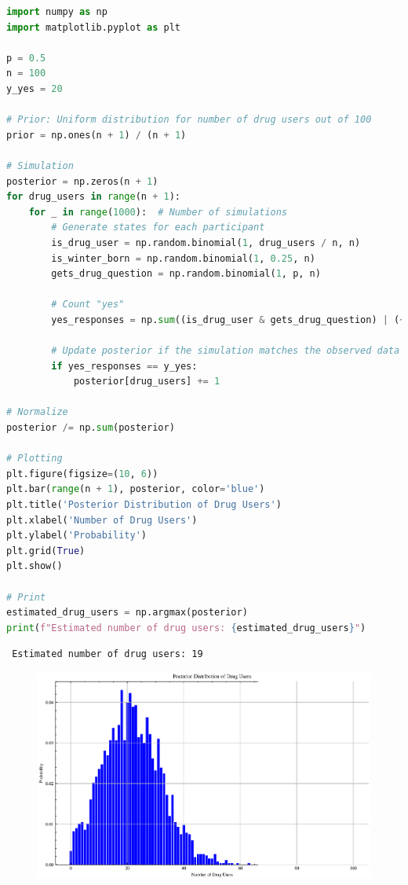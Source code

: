 \documentclass[12pt]{article}
\begin{document}
\begin{lstlisting}[language=Python]
import numpy as np
import matplotlib.pyplot as plt

p = 0.5
n = 100
y_yes = 20

# Prior: Uniform distribution for number of drug users out of 100
prior = np.ones(n + 1) / (n + 1)

# Simulation
posterior = np.zeros(n + 1)
for drug_users in range(n + 1):
    for _ in range(1000):  # Number of simulations
        # Generate states for each participant
        is_drug_user = np.random.binomial(1, drug_users / n, n)
        is_winter_born = np.random.binomial(1, 0.25, n)
        gets_drug_question = np.random.binomial(1, p, n)

        # Count "yes"
        yes_responses = np.sum((is_drug_user & gets_drug_question) | (~is_drug_user & ~gets_drug_question & is_winter_born))
        
        # Update posterior if the simulation matches the observed data
        if yes_responses == y_yes:
            posterior[drug_users] += 1

# Normalize
posterior /= np.sum(posterior)

# Plotting
plt.figure(figsize=(10, 6))
plt.bar(range(n + 1), posterior, color='blue')
plt.title('Posterior Distribution of Drug Users')
plt.xlabel('Number of Drug Users')
plt.ylabel('Probability')
plt.grid(True)
plt.show()

# Print
estimated_drug_users = np.argmax(posterior)
print(f"Estimated number of drug users: {estimated_drug_users}")
\end{lstlisting}

\begin{verbatim}
 Estimated number of drug users: 19
\end{verbatim}

\begin{figure}[ht!]
    \centering
    \includegraphics{myimage2.eps}
    \caption{}
    \label{fig:enter-label2}
\end{figure}
\end{document}
